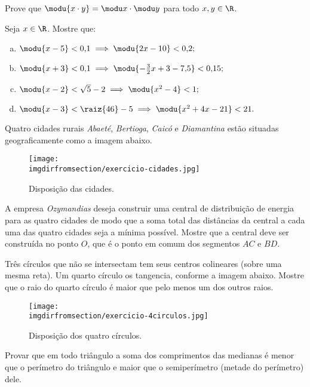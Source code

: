 \begin{exercise}
Prove que $\modu{x\cdot y } = \modu x \cdot \modu y$ para todo
$x, y \in \R$.
\end{exercise}

\begin{exercise}
Seja $x \in \R$. Mostre que:
\begin{enumerate}[a)]
    \item $\modu{x-5}<0{,}1 \implies \modu{2x - 10}< 0{,}2;$
    \item $\modu{x+3}<0{,}1 \implies \modu{-\frac 3 2 x + 3 -
    7{,}5}<0{,}15;$
    \item $\modu{x-2}< \sqrt{5} - 2 \implies \modu{x^2 - 4}< 1;$
    \item $\modu{ x - 3 } < \raiz{46} - 5 \implies \modu{ x^2 + 4x - 21 } < 21.$
\end{enumerate}
\end{exercise}


\begin{exercise}
	Quatro cidades rurais \emph{Abaeté}, \emph{Bertioga}, \emph{Caicó} e \emph{Diamantina} estão situadas geograficamente como a imagem abaixo.
	\begin{figure}[H]
		\centering
		\label{fig:exercicio-cidades}
		\texttt{[image: \\imgdirfromsection/exercicio-cidades.jpg]}
		\caption{Disposição das cidades.}
	\end{figure}
	A empresa \emph{Ozymandias} deseja construir uma central de distribuição de energia para as quatro cidades de modo que a soma total das distâncias da central a cada uma das quatro cidades seja a mínima possível. Mostre que a central deve ser construída no ponto $O$, que é o ponto em comum dos segmentos $AC$ e $BD$.
\end{exercise}

\begin{exercise}
  Três círculos que não se intersectam tem seus centros colineares (sobre uma mesma reta). Um quarto círculo os tangencia, conforme a imagem abaixo. Mostre que o raio do quarto círculo é maior que pelo menos um dos outros raios.
  \begin{figure}[H]
		\centering
		\label{fig:exercicio-4circulos}
    \texttt{[image: \\imgdirfromsection/exercicio-4circulos.jpg]}
		\caption{Disposição dos quatro círculos.}
	\end{figure}
\end{exercise}

\begin{exercise}
Provar que em todo triângulo a soma dos comprimentos das
medianas é menor que o perímetro do triângulo e maior que o
semiperímetro (metade do perímetro) dele.
\end{exercise}

